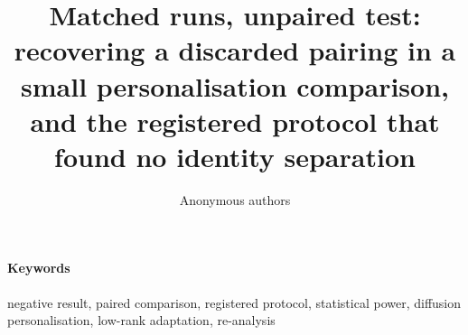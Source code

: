 \documentclass[11pt]{article}
\title{Matched runs, unpaired test: recovering a discarded pairing in a small
personalisation comparison, and the registered protocol that found no
identity separation}
\author{Anonymous authors}
\date{}
\numberwithin{equation}{section}
\begin{document}
\maketitle

\begin{abstract}

\end{abstract}

\paragraph{Keywords} negative result, paired comparison, registered protocol, statistical power, diffusion personalisation, low-rank adaptation, re-analysis





\end{document}
